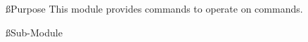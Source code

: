 
\ss{Purpose}
This module provides commands to operate on commands.

\ss{Sub-Module}



\clearpage


\clearpage


\clearpage


\clearpage


\clearpage


\clearpage

